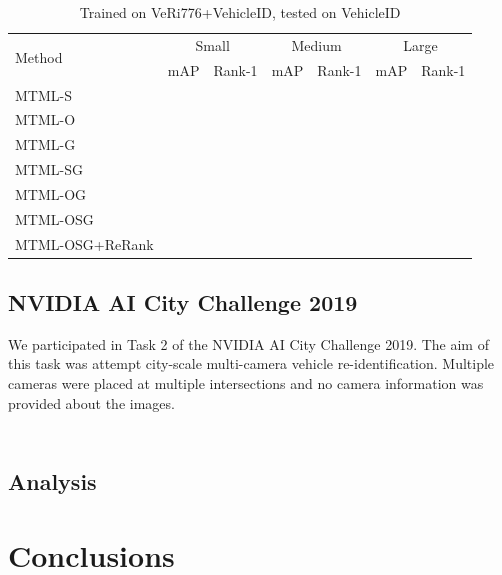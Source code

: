 \documentclass[10pt,twocolumn,letterpaper]{article}
\begin{document}
\begin{table}
  \centering
  \begin{tabular}{l || c | c || c | c || c | c }
    \hline
    \multirow{2}{*}{Method} & \multicolumn{2}{c}{Small} & \multicolumn{2}{c}{Medium} &\multicolumn{2}{c}{Large} \\
    \cline{2-7}
    & mAP & Rank-1 & mAP & Rank-1 & mAP & Rank-1 \\
    \hline
    MTML-S & \\
    MTML-O & \\
    MTML-G & \\
    MTML-SG & \\
    MTML-OG & \\
    MTML-OSG & \\
    MTML-OSG+ReRank & \\
    \hline
  \end{tabular}
  \caption{Trained on VeRi776+VehicleID, tested on VehicleID}
  \label{T:benchmark_results_vehicleid}
\end{table}

\subsection{NVIDIA AI City Challenge 2019}

We participated in Task 2 of the NVIDIA AI City Challenge 2019. The aim of this task was attempt city-scale multi-camera vehicle re-identification. Multiple cameras were placed at multiple intersections and no camera information was provided about the images.

\begin{table}
  \centering
  \begin{tabular}{l || c | c}

  \end{tabular}
  \caption{}
  \label{T:aicity_results}
\end{table}

\subsection{Analysis}

\section{Conclusions}

{\small


}
\end{document}
